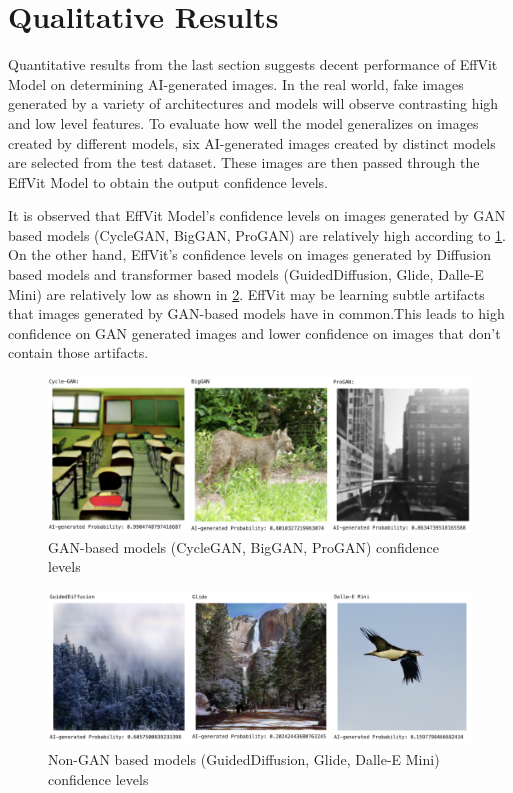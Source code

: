\documentclass{article} %
\begin{document}
\section{Qualitative Results}
Quantitative results from the last section suggests decent performance of EffVit Model on determining AI-generated images. In the real world, fake images generated by a variety of architectures and models will observe contrasting high and low level features. To evaluate how well the model generalizes on images created by different models, six AI-generated images created by distinct models are selected from the test dataset. These images are then passed through the EffVit Model to obtain the output confidence levels. 

It is observed that EffVit Model's confidence levels on images generated by GAN based models (CycleGAN, BigGAN, ProGAN) are relatively high according to \ref{fig:Gan_Conf}. On the other hand, EffVit's confidence levels on images generated by Diffusion based models and transformer based models (GuidedDiffusion, Glide, Dalle-E Mini) are relatively low as shown in \ref{fig:non-Gan_Conf}. EffVit may be learning subtle artifacts that images generated by GAN-based models have in common.This leads to high confidence on GAN generated images and lower confidence on images that don't contain those artifacts.

\begin{figure}[h]
    \begin{center}
        \includegraphics[scale=0.4]{figs/GAN_Confidence.png}
    \end{center}
    \caption{GAN-based models (CycleGAN, BigGAN, ProGAN) confidence levels}
    \label{fig:Gan_Conf}
\end{figure}
\begin{figure}[h]
    \begin{center}
        \includegraphics[scale=0.45]{figs/non-GAN_Confidence.png}
    \end{center}
    \caption{Non-GAN based models (GuidedDiffusion, Glide, Dalle-E Mini) confidence levels}
    \label{fig:non-Gan_Conf}
\end{figure}
\end{document}
